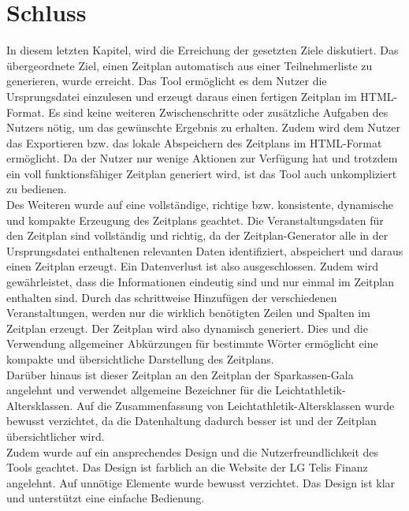 
\chapter{Schluss}
\label{chap:Schluss}

In diesem letzten Kapitel, wird die Erreichung der gesetzten Ziele diskutiert.
Das übergeordnete Ziel, einen Zeitplan automatisch aus einer Teilnehmerliste zu generieren, wurde erreicht. Das Tool ermöglicht es dem Nutzer die Ursprungsdatei einzulesen und erzeugt daraus einen fertigen Zeitplan im HTML-Format. Es sind keine weiteren Zwischenschritte oder zusätzliche Aufgaben des Nutzers nötig, um das gewünschte Ergebnis zu erhalten. Zudem wird dem Nutzer das Exportieren bzw. das lokale Abspeichern des Zeitplans im HTML-Format ermöglicht. Da der Nutzer nur wenige Aktionen zur Verfügung hat und trotzdem ein voll funktionsfähiger Zeitplan generiert wird, ist das Tool auch unkompliziert zu bedienen.\\
Des Weiteren wurde auf eine vollständige, richtige bzw. konsistente, dynamische und kompakte Erzeugung des Zeitplans geachtet. Die Veranstaltungsdaten für den Zeitplan sind vollständig und richtig, da der Zeitplan-Generator alle in der Ursprungsdatei enthaltenen relevanten Daten identifiziert, abspeichert und daraus einen Zeitplan erzeugt. Ein Datenverlust ist also ausgeschlossen. Zudem wird gewährleistet, dass die Informationen eindeutig sind und nur einmal im Zeitplan enthalten sind. Durch das schrittweise Hinzufügen der verschiedenen Veranstaltungen, werden nur die wirklich benötigten Zeilen und Spalten im Zeitplan erzeugt. Der Zeitplan wird also dynamisch generiert. Dies und die Verwendung allgemeiner Abkürzungen für bestimmte Wörter ermöglicht eine kompakte und übersichtliche Darstellung des Zeitplans.\\
Darüber hinaus ist dieser Zeitplan an den Zeitplan der Sparkassen-Gala angelehnt und verwendet allgemeine Bezeichner für die Leichtathletik-Altersklassen. Auf die Zusammenfassung von Leichtathletik-Altersklassen wurde bewusst verzichtet, da die Datenhaltung dadurch besser ist und der Zeitplan übersichtlicher wird.\\
Zudem wurde auf ein ansprechendes Design und die Nutzerfreundlichkeit des Tools geachtet. Das Design ist farblich an die Website der LG Telis Finanz angelehnt. Auf unnötige Elemente wurde bewusst verzichtet. Das Design ist klar und unterstützt eine einfache Bedienung.\\
